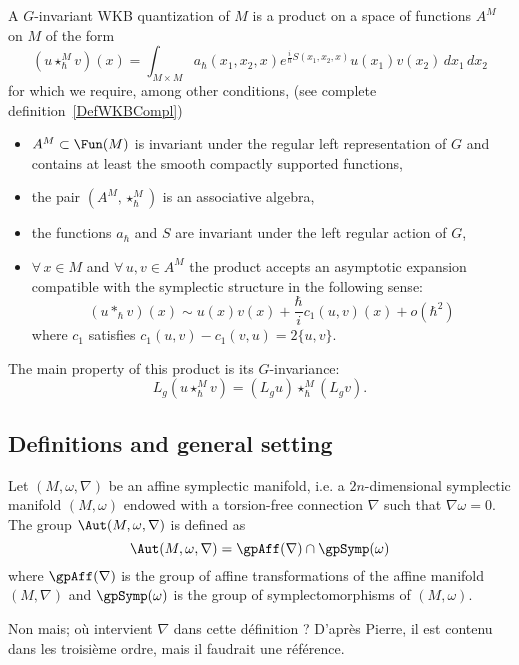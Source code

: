 A $G$-invariant WKB quantization of $M$ is a product on a space of functions $A^{M}$ on $M$ of the form
\[
  (u\star^M_{\hbar}v)(x)=\int_{M\times M} a_{\hbar}(x_1,x_2,x) e^{\frac{ i }{ \hbar }S(x_1,x_2,x)} u(x_1)v(x_2)\,dx_1\,dx_2
\]
for which we require, among other conditions, (see complete definition~\ref{DefWKBCompl})
\begin{itemize}
\item $A^M\subset \Fun(M)$ is invariant under the regular left representation of $G$ and contains at least the smooth compactly supported functions,
\item the pair $(A^M,\star^M_{\hbar})$ is an associative algebra,
\item the functions $a_{\hbar}$ and $S$ are invariant under the left regular action of $G$,
\item $\forall\, x\in M$ and $\forall\,u,v\in A^M$ the product accepts an asymptotic expansion compatible with the symplectic structure in the following sense:
\[
  (u\ast_{\hbar} v)(x)\sim u(x)v(x)+\frac{ \hbar }{ i }c_{1}(u,v)(x)+o(\hbar^{2})
\]
where $c_{1}$ satisfies $c_{1}(u,v)-c_{1}(v,u)=2\{ u,v \}$.
\end{itemize}
The main property of this product is its $G$-invariance:
\[
  L_g(u\star^M_{\hbar}v)=(L_gu)\star^M_{\hbar}(L_gv).
\]

\subsection{Definitions and general setting}

Let $(M,\omega,\nabla)$ be an affine symplectic manifold, i.e. a $2n$-dimensional symplectic manifold $(M,\omega)$ endowed with a torsion-free connection $\nabla$ such that $\nabla\omega=0$. The  group $\Aut(M,\omega,\nabla)$ is defined as
\[
  \Aut(M,\omega,\nabla)=\gpAff(\nabla)\cap\gpSymp(\omega)
\]
where $\gpAff(\nabla)$ is the group of affine transformations of the affine manifold $(M,\nabla)$ and $\gpSymp(\omega)$ is the group of symplectomorphisms of $(M,\omega)$.


\begin{probleme}
Non mais; où intervient $\nabla$ dans cette définition ? D'après Pierre, il est contenu dans les troisième ordre, mais il faudrait une référence.
\label{ProbNablades}
\end{probleme}

